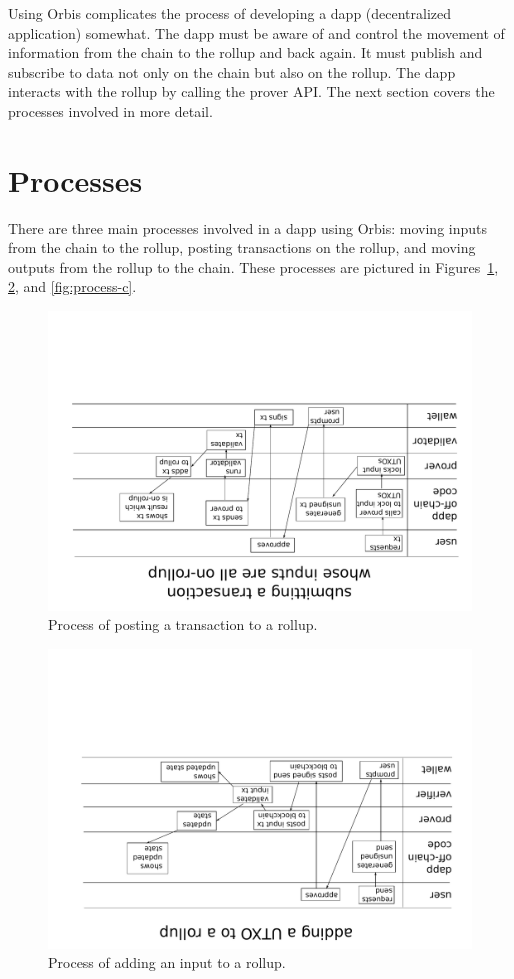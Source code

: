\documentclass[12pt]{article}
\begin{document}
Using Orbis complicates the process of developing a dapp (decentralized application) somewhat. The dapp must be aware of and control the movement of information from the chain to the rollup and back again. It must publish and subscribe to data not only on the chain but also on the rollup. The dapp interacts with the rollup by calling the prover API. The next section covers the processes involved in more detail.


\section{Processes}

There are three main processes involved in a dapp using Orbis: moving inputs from the chain to the rollup, posting transactions on the rollup, and moving outputs from the rollup to the chain. These processes are pictured in Figures~\ref{fig:process-a}, \ref{fig:process-b}, and \ref{fig:process-c}.

\begin{figure}
	\includegraphics[angle=180,width=1.0\columnwidth]{process-diagram-a.pdf}
	\caption{Process of posting a transaction to a rollup.}
	\label{fig:process-a}
\end{figure}

\begin{figure}
	\includegraphics[angle=180,width=1.0\columnwidth]{process-diagram-b.pdf}
	\caption{Process of adding an input to a rollup.}
	\label{fig:process-b}
\end{figure}
\end{document}
